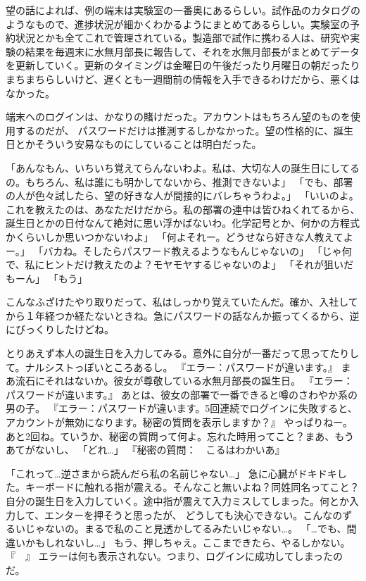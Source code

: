望の話によれば、例の端末は実験室の一番奥にあるらしい。試作品のカタログのようなもので、進捗状況が細かくわかるようにまとめてあるらしい。実験室の予約状況とかも全てこれで管理されている。製造部で試作に携わる人は、研究や実験の結果を毎週末に水無月部長に報告して、それを水無月部長がまとめてデータを更新していく。更新のタイミングは金曜日の午後だったり月曜日の朝だったりまちまちらしいけど、遅くとも一週間前の情報を入手できるわけだから、悪くはなかった。

端末へのログインは、かなりの賭けだった。アカウントはもちろん望のものを使用するのだが、
パスワードだけは推測するしかなかった。望の性格的に、誕生日とかそういう安易なものにしていることは明白だった。

「あんなもん、いちいち覚えてらんないわよ。私は、大切な人の誕生日にしてるの。もちろん、私は誰にも明かしてないから、推測できないよ」
「でも、部署の人が色々試したら、望の好きな人が間接的にバレちゃうわよ。」
「いいのよ。これを教えたのは、あなただけだから。私の部署の連中は皆ひねくれてるから、誕生日とかの日付なんて絶対に思い浮かばないわ。化学記号とか、何かの方程式かくらいしか思いつかないわよ」
「何よそれー。どうせなら好きな人教えてよー。」
「バカね。そしたらパスワード教えるようなもんじゃないの」
「じゃ何で、私にヒントだけ教えたのよ？モヤモヤするじゃないのよ」
「それが狙いだもーん」
「もう」

こんなふざけたやり取りだって、私はしっかり覚えていたんだ。確か、入社してから１年経つか経たないときね。急にパスワードの話なんか振ってくるから、逆にびっくりしたけどね。

とりあえず本人の誕生日を入力してみる。意外に自分が一番だって思ってたりして。ナルシストっぽいところあるし。
『エラー：パスワードが違います。』
まあ流石にそれはないか。彼女が尊敬している水無月部長の誕生日。
『エラー：パスワードが違います。』
あとは、彼女の部署で一番できると噂のさわやか系の男の子。
『エラー：パスワードが違います。5回連続でログインに失敗すると、アカウントが無効になります。秘密の質問を表示しますか？』
やっぱりねー。あと2回ね。ていうか、秘密の質問って何よ。忘れた時用ってこと？まあ、もうあてがないし、
「どれ…」
『秘密の質問：　こるはわかいあ』

「これって…逆さまから読んだら私の名前じゃない…」
急に心臓がドキドキした。キーボードに触れる指が震える。そんなこと無いよね？同姓同名ってこと？
自分の誕生日を入力していく。途中指が震えて入力ミスしてしまった。何とか入力して、エンターを押そうと思ったが、
どうしても決心できない。こんなのずるいじゃないの。まるで私のこと見透かしてるみたいじゃない…。
「…でも、間違いかもしれないし…」
もう、押しちゃえ。ここまできたら、やるしかない。
『　』
エラーは何も表示されない。つまり、ログインに成功してしまったのだ。

